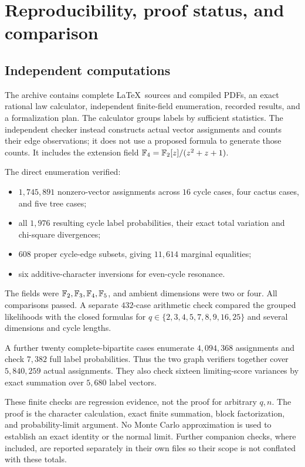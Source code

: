 \section{Reproducibility, proof status, and comparison}\label{sec:provenance}

\subsection{Independent computations}
The archive contains complete \LaTeX\ sources and compiled PDFs, an exact rational
law calculator, independent finite-field enumeration, recorded results, and a
formalization plan. The calculator groups labels by sufficient statistics.
The independent checker instead constructs actual vector assignments and counts
their edge observations; it does not use a proposed formula to generate those
counts. It includes the extension field
$\mathbb F_4=\mathbb F_2[z]/(z^2+z+1)$.

The direct enumeration verified:
\begin{itemize}
\item $1{,}745{,}891$ nonzero-vector assignments across $16$ cycle cases, four
cactus cases, and five tree cases;
\item all $1{,}976$ resulting cycle label probabilities, their exact total
variation and chi-square divergences;
\item $608$ proper cycle-edge subsets, giving $11{,}614$ marginal equalities;
\item six additive-character inversions for even-cycle resonance.
\end{itemize}
The fields were $\mathbb F_2,\mathbb F_3,\mathbb F_4,\mathbb F_5$, and ambient dimensions were two or four.
All comparisons passed. A separate $432$-case arithmetic check compared the
grouped likelihoods with the closed formulas for
$q\in\{2,3,4,5,7,8,9,16,25\}$ and several dimensions and cycle lengths.

A further twenty complete-bipartite cases enumerate $4{,}094{,}368$ assignments and check $7{,}382$ full label probabilities. Thus the two graph verifiers together cover $5{,}840{,}259$ actual assignments. They also check sixteen limiting-score variances by exact summation over $5{,}680$ label vectors.

These finite checks are regression evidence, not the proof for arbitrary
$q,n$. The proof is the character calculation, exact finite summation,
block factorization, and probability-limit argument. No Monte Carlo
approximation is used to establish an exact identity or the normal limit.
Further companion checks, where included, are reported separately in their
own files so their scope is not conflated with these totals.

